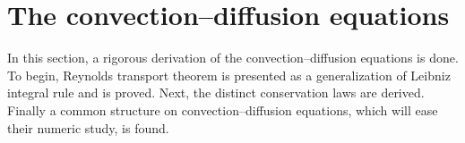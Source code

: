 
\section{The convection--diffusion equations}

In this section, a rigorous derivation of the convection--diffusion equations is done. To begin, Reynolds transport theorem is presented as a generalization of Leibniz integral rule and is proved. Next, the distinct conservation laws are derived. Finally a common structure on convection--diffusion equations, which will ease their numeric study, is found.








